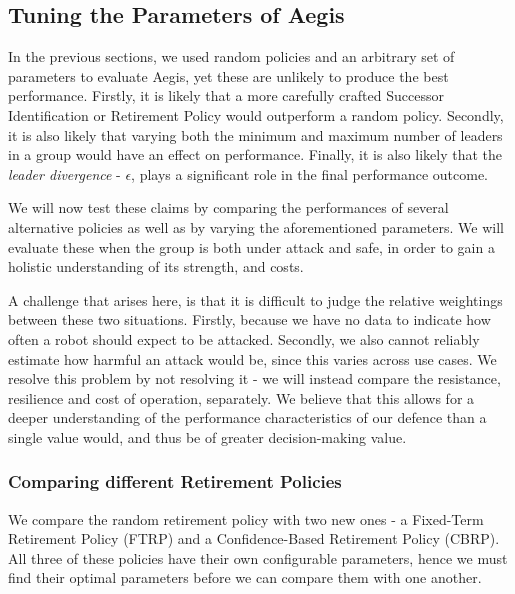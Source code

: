 \subsection{Tuning the Parameters of Aegis} \label{section:optim}
In the previous sections, we used random policies and an arbitrary set of parameters to evaluate Aegis, yet these are unlikely to produce the best performance. Firstly, it is likely that a more carefully crafted Successor Identification or Retirement Policy would outperform a random policy. Secondly, it is also likely that varying both the minimum and maximum number of leaders in a group would have an effect on performance. Finally, it is also likely that the \textit{leader divergence} - $\epsilon$, plays a significant role in the final performance outcome.

We will now test these claims by comparing the performances of several alternative policies as well as by varying the aforementioned parameters. We will evaluate these when the group is both under attack and safe, in order to gain a holistic understanding of its strength, and costs.

A challenge that arises here, is that it is difficult to judge the relative weightings between these two situations. Firstly, because we have no data to indicate how often a robot should expect to be attacked. Secondly, we also cannot reliably estimate how harmful an attack would be, since this varies across use cases. We resolve this problem by not resolving it - we will instead compare the resistance, resilience and cost of operation, separately. We believe that this allows for a deeper understanding of the performance characteristics of our defence than a single value would, and thus be of greater decision-making value.

\subsubsection{Comparing different Retirement Policies}
We compare the random retirement policy with two new ones - a Fixed-Term Retirement Policy (FTRP) and a Confidence-Based Retirement Policy (CBRP). All three of these policies have their own configurable parameters, hence we must find their optimal parameters before we can compare them with one another.

